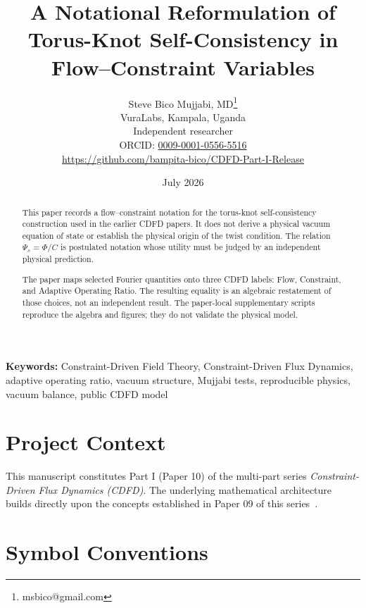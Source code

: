 \documentclass[11pt]{article}
\begin{document}
\title{A Notational Reformulation of Torus-Knot Self-Consistency in Flow--Constraint Variables}

\author{Steve Bico Mujjabi, MD\thanks{msbico@gmail.com}\\
VuraLabs, Kampala, Uganda\\
Independent researcher\\
ORCID: \href{https://orcid.org/0009-0001-0556-5516}{0009-0001-0556-5516}\\
\url{https://github.com/bampita-bico/CDFD-Part-I-Release}}

\date{July 2026}

\maketitle

\begin{abstract}
This paper records a flow--constraint notation for the torus-knot
self-consistency construction used in the earlier CDFD papers. It does not
derive a physical vacuum equation of state or establish the physical origin of
the twist condition. The relation $\Psi_s=\Phi/C$ is postulated notation whose
utility must be judged by an independent physical prediction.

The paper maps selected Fourier quantities onto three CDFD labels: Flow,
Constraint, and Adaptive Operating Ratio. The resulting equality is an
algebraic restatement of those choices, not an independent result. The
paper-local supplementary scripts reproduce the algebra and figures; they do
not validate the physical model.
\end{abstract}

\noindent\textbf{Keywords:} Constraint-Driven Field Theory, Constraint-Driven Flux Dynamics, adaptive operating ratio, vacuum structure, Mujjabi tests, reproducible physics, vacuum balance, public CDFD model

\vspace{0.75em}
\linenumbers

\section*{Project Context}
This manuscript constitutes Part I (Paper 10) of the multi-part series
\textit{Constraint-Driven Flux Dynamics (CDFD)}. The underlying mathematical
architecture builds directly upon the concepts established in Paper 09 of this
series~\cite{MujjabiIX2026}.

\section*{Symbol Conventions}
\end{document}
